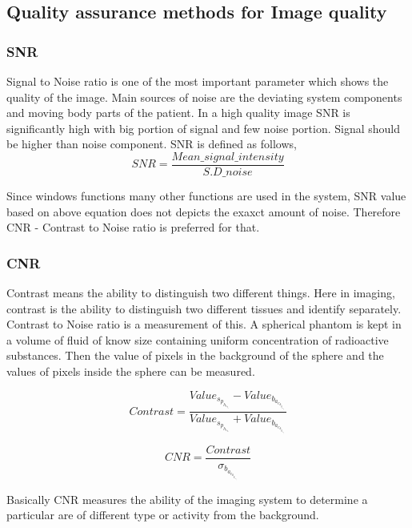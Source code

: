 \documentclass[12pt]{article}
\begin{document}
\pagebreak
\subsection{Quality assurance methods for Image quality}
\subsubsection{SNR}
Signal to Noise ratio is one of the most important parameter which shows the quality of the image. Main sources of noise are the deviating system components and moving body parts of the patient. In a high quality image SNR is significantly high with big portion of signal and few noise portion. Signal should be higher than noise component. 
SNR is defined as follows,
\begin{equation*}
    SNR = \frac{Mean\_signal\_intensity}{S.D\_noise}
\end{equation*}

Since windows functions many other functions are used in the system, SNR value based on above equation does not depicts the exaxct amount of noise. Therefore CNR - Contrast to Noise ratio is preferred for that.

\subsubsection{CNR}
Contrast means the ability to distinguish two different things. Here in imaging, contrast is the ability to distinguish two different tissues and identify separately. Contrast to Noise ratio is a measurement of this. A spherical phantom is kept in a volume of fluid of know size containing uniform concentration of radioactive substances. Then the value of pixels in the background of the sphere and the values of pixels inside the sphere can be measured. 

\begin{equation*}
    Contrast = \frac{Value_s_p_h_e_r_e - Value_b_a_c_k_g_r_o_u_n_d}{Value_s_p_h_e_r_e + Value_b_a_c_k_g_r_o_u_n_d}
\end{equation*}

\begin{equation*}
    CNR = \frac{Contrast}{\sigma _b_a_c_k_g_r_o_u_n_d }
\end{equation*}

Basically CNR measures the ability of the imaging system to determine a particular are of different type or activity from the background. 
\end{document}
